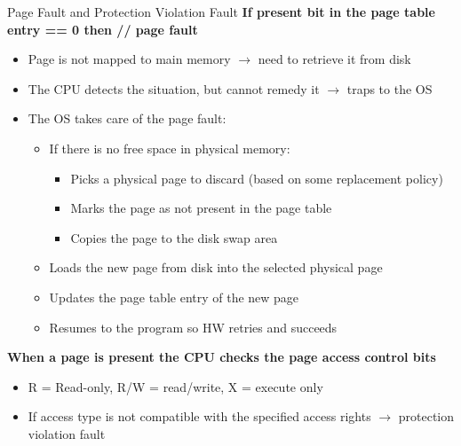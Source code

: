 \documentclass[aspectratio=169,12pt]{beamer}
\begin{document}
\begin{frame}{Page Fault and Protection Violation Fault}
\textbf{If present bit in the page table entry == 0 then // page fault}
\begin{itemize}
\item Page is not mapped to main memory $\rightarrow$ need to retrieve it from disk
\item The CPU detects the situation, but cannot remedy it $\rightarrow$ traps to the OS
\item The OS takes care of the page fault:
    \begin{itemize}
    \item If there is no free space in physical memory:
        \begin{itemize}
        \item Picks a physical page to discard (based on some replacement policy)
        \item Marks the page as not present in the page table
        \item Copies the page to the disk swap area
        \end{itemize}
    \item Loads the new page from disk into the selected physical page
    \item Updates the page table entry of the new page
    \item Resumes to the program so HW retries and succeeds
    \end{itemize}
\end{itemize}
\textbf{When a page is present the CPU checks the page access control bits}
\begin{itemize}
\item R = Read-only, R/W = read/write, X = execute only
\item If access type is not compatible with the specified access rights $\rightarrow$ protection violation fault
\end{itemize}
\end{frame}
\end{document}
